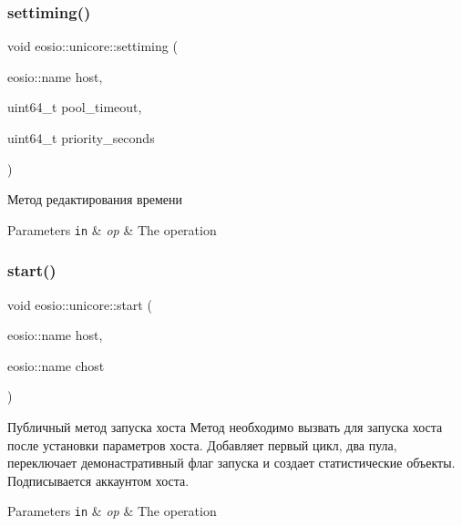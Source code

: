 \subsubsection{\texorpdfstring{settiming()}{settiming()}}
{\footnotesize\ttfamily void eosio\+::unicore\+::settiming (\begin{DoxyParamCaption}\item[{eosio\+::name}]{host,  }\item[{uint64\+\_\+t}]{pool\+\_\+timeout,  }\item[{uint64\+\_\+t}]{priority\+\_\+seconds }\end{DoxyParamCaption})}



Метод редактирования времени 


\begin{DoxyParams}[1]{Parameters}
\mbox{\tt in}  & {\em op} & The operation \\
\hline
\end{DoxyParams}
\mbox{\label{classeosio_1_1unicore_a6d49834320bcf0133e9399a3b45ac3e5}} 
\subsubsection{\texorpdfstring{start()}{start()}}
{\footnotesize\ttfamily void eosio\+::unicore\+::start (\begin{DoxyParamCaption}\item[{eosio\+::name}]{host,  }\item[{eosio\+::name}]{chost }\end{DoxyParamCaption})}



Публичный метод запуска хоста Метод необходимо вызвать для запуска хоста после установки параметров хоста. Добавляет первый цикл, два пула, переключает демонастративный флаг запуска и создает статистические объекты. Подписывается аккаунтом хоста. 


\begin{DoxyParams}[1]{Parameters}
\mbox{\tt in}  & {\em op} & The operation \\
\hline
\end{DoxyParams}
\mbox{\label{classeosio_1_1unicore_a2464971a6336dedb991282d0b396177e}} 
